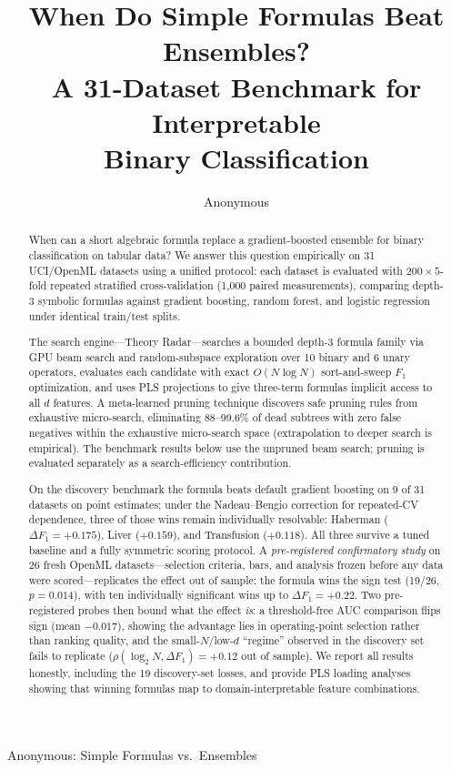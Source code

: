 \documentclass[journal]{IEEEtran}
\begin{document}
\title{When Do Simple Formulas Beat Ensembles?\\
A 31-Dataset Benchmark for Interpretable\\Binary Classification}

\author{Anonymous}

{Anonymous: Simple Formulas vs.\ Ensembles}

\maketitle

\begin{abstract}
When can a short algebraic formula replace a gradient-boosted
ensemble for binary classification on tabular data?  We answer this
question empirically on 31 UCI/OpenML datasets using a unified
protocol: each dataset is evaluated with $200 \times 5$-fold
repeated stratified cross-validation (1{,}000 paired measurements),
comparing depth-3 symbolic formulas against gradient boosting,
random forest, and logistic regression under identical train/test
splits.

The search engine---Theory Radar---searches a bounded depth-3
formula family via GPU beam search and random-subspace exploration
over 10 binary and 6 unary operators, evaluates each candidate with
exact $O(N \log N)$ sort-and-sweep $F_1$ optimization, and uses PLS
projections to give three-term formulas implicit access to all $d$
features.  A meta-learned pruning
technique discovers safe pruning rules from exhaustive micro-search,
eliminating 88--99.6\% of dead subtrees with zero false negatives
within the exhaustive micro-search space (extrapolation to deeper
search is empirical).  The benchmark results below use the unpruned
beam search; pruning is evaluated separately as a search-efficiency
contribution.

On the discovery benchmark the formula beats default gradient
boosting on 9 of 31 datasets on point estimates; under the
Nadeau--Bengio correction for repeated-CV dependence, three of
those wins remain individually resolvable: Haberman
($\Delta F_1 = {+}0.175$), Liver ($+0.159$), and Transfusion
($+0.118$).  All three survive a tuned baseline and a fully
symmetric scoring protocol.  A \emph{pre-registered confirmatory
study} on 26 fresh OpenML datasets---selection criteria, bars, and
analysis frozen before any data were scored---replicates the effect
out of sample: the formula wins the sign test (19/26,
$p = 0.014$), with ten individually significant wins up to
$\Delta F_1 = {+}0.22$.  Two pre-registered probes then bound what
the effect \emph{is}: a threshold-free AUC comparison flips sign
(mean ${-}0.017$), showing the advantage lies in operating-point
selection rather than ranking quality, and the
small-$N$/low-$d$ ``regime'' observed in the discovery set fails
to replicate ($\rho(\log_2 N, \Delta F_1) = {+}0.12$ out of
sample).  We report all results honestly, including the 19
discovery-set losses, and provide PLS loading analyses showing
that winning formulas map to domain-interpretable feature
combinations.


\end{abstract}
\end{document}
